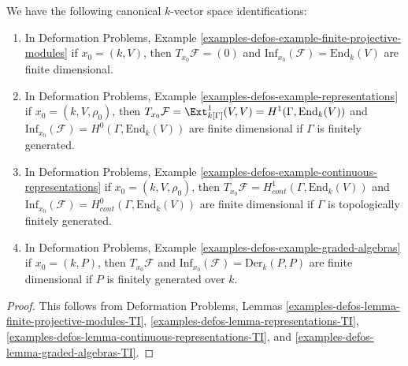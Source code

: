 \begin{lemma}
\label{lemma-tangent-and-inf}
We have the following canonical $k$-vector space identifications:
\begin{enumerate}
\item In Deformation Problems, Example
\ref{examples-defos-example-finite-projective-modules}
if $x_0 = (k, V)$, then $T_{x_0}\mathcal{F} = (0)$
and $\text{Inf}_{x_0}(\mathcal{F}) = \text{End}_k(V)$
are finite dimensional.
\item In Deformation Problems, Example
\ref{examples-defos-example-representations}
if $x_0 = (k, V, \rho_0)$, then
$T_{x_0}\mathcal{F} = \Ext^1_{k[\Gamma]}(V, V) = H^1(\Gamma, \text{End}_k(V))$
and $\text{Inf}_{x_0}(\mathcal{F}) = H^0(\Gamma, \text{End}_k(V))$
are finite dimensional if $\Gamma$ is finitely generated.
\item In Deformation Problems, Example
\ref{examples-defos-example-continuous-representations}
if $x_0 = (k, V, \rho_0)$, then
$T_{x_0}\mathcal{F} = H^1_{cont}(\Gamma, \text{End}_k(V))$
and
$\text{Inf}_{x_0}(\mathcal{F}) = H^0_{cont}(\Gamma, \text{End}_k(V))$
are finite dimensional if $\Gamma$ is topologically finitely generated.
\item In Deformation Problems, Example
\ref{examples-defos-example-graded-algebras}
if $x_0 = (k, P)$, then
$T_{x_0}\mathcal{F}$ and $\text{Inf}_{x_0}(\mathcal{F}) = \text{Der}_k(P, P)$
are finite dimensional if $P$ is finitely generated over $k$.
\end{enumerate}
\end{lemma}

\begin{proof}
This follows from Deformation Problems, Lemmas
\ref{examples-defos-lemma-finite-projective-modules-TI},
\ref{examples-defos-lemma-representations-TI},
\ref{examples-defos-lemma-continuous-representations-TI}, and
\ref{examples-defos-lemma-graded-algebras-TI}.
\end{proof}












